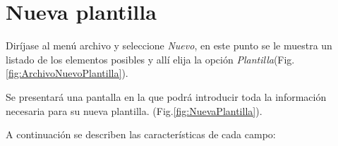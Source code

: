 \section{Nueva plantilla}
\label{sec:nuevaPlantilla}
Dir\'ijase al men\'u archivo y seleccione \emph{Nuevo}, en este punto se le muestra un listado de los elementos posibles y
all\'i elija la opci\'on \emph{Plantilla}(Fig.\ref{fig:ArchivoNuevoPlantilla}). 
  

Se presentar\'a una pantalla en la que podr\'a introducir toda la informaci\'on
necesaria para su nueva plantilla. (Fig.\ref{fig:NuevaPlantilla}). 
  
A continuaci\'on se describen las
caracter\'isticas de cada campo:
